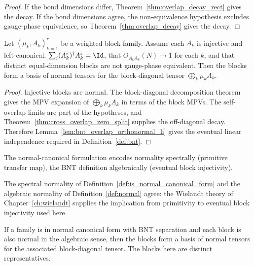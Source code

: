 \begin{proof}\leanok{}
    If the bond dimensions differ, Theorem~\ref{thm:overlap_decay_rect}
    gives the decay. If the bond dimensions agree, the non-equivalence
    hypothesis excludes gauge-phase equivalence, so
    Theorem~\ref{thm:overlap_decay} gives the decay.
\end{proof}

\begin{lemma}
    \label{lem:cf_bnt_is_bnt_split}
    \leanok
    Let $(\mu_k, A_k)_{k=1}^r$ be a weighted block family. Assume each $A_k$ is
    injective and left-canonical, $\sum_i (A_k^i)^\dagger A_k^i = \Id$, that
    $O_{A_kA_k}(N) \to 1$ for each $k$, and that distinct equal-dimension blocks
    are not gauge-phase equivalent. Then the blocks form a basis of normal
    tensors for the block-diagonal tensor $\bigoplus_k \mu_k A_k$.
\end{lemma}

\begin{proof}\leanok
    Injective blocks are normal. The block-diagonal decomposition theorem gives
    the MPV expansion of $\bigoplus_k \mu_k A_k$ in terms of the block MPVs.
    The self-overlap limits are part of the hypotheses, and
    Theorem~\ref{thm:cross_overlap_zero_split} supplies the off-diagonal
    decay. Therefore Lemma~\ref{lem:bnt_overlap_orthonormal_li} gives the
    eventual linear independence required in Definition~\ref{def:bnt}.
\end{proof}

The normal-canonical formulation encodes normality spectrally (primitive
transfer map), the BNT definition algebraically (eventual block injectivity).

\begin{remark}%
    \label{rem:normalcf_bnt_gap}
    The spectral normality of Definition~\ref{def:is_normal_canonical_form} and
    the algebraic normality of Definition~\ref{def:normal} agree: the Wielandt
    theory of Chapter~\ref{ch:wielandt} supplies the implication from
    primitivity to eventual block injectivity used here.
\end{remark}

\begin{lemma}
    \label{lem:normal_cf_bnt_is_bnt}
    \leanok
    If a family is in normal canonical form with BNT separation and each block
    is also normal in the algebraic sense, then the blocks form a basis of
    normal tensors for the associated block-diagonal tensor. The blocks here are
    distinct representatives.
\end{lemma}

